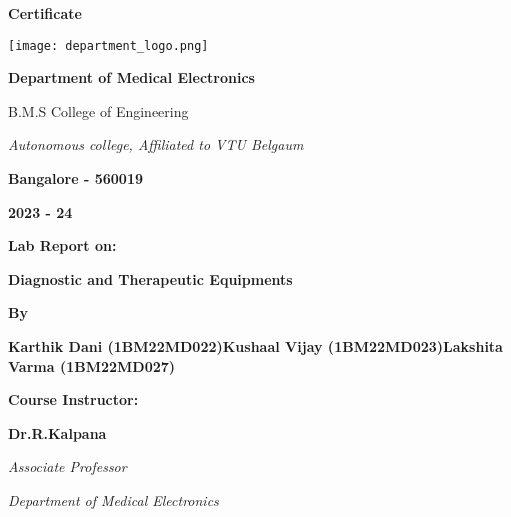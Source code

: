 \documentclass[a4paper, 12pt]{article}
\begin{document}
\begin{center}
    \LARGE \textbf{Certificate}
\end{center}

\vspace{0.5cm}

\begin{center}
    \texttt{[image: department\_logo.png]} %
\end{center}


\begin{center}
    \LARGE \textbf{Department of Medical Electronics}
\end{center}


\begin{center}
    \large B.M.S College of Engineering
\end{center}

\begin{center}
    \textit{Autonomous college, Affiliated to VTU Belgaum}
\end{center}

\begin{center}
    \textbf{Bangalore - 560019}
\end{center}

\begin{center}
    \textbf{2023 - 24}
\end{center}

\vspace{0.7cm}

\begin{center}
    \textbf{Lab Report on:}
\end{center}

\begin{center}
    \large \textbf{Diagnostic and Therapeutic Equipments}
\end{center}

\vspace{0.7cm}

\begin{center}
    \textbf{By}
\end{center}

\begin{center}
    \textbf{Karthik Dani (1BM22MD022)\n Kushaal Vijay (1BM22MD023)\n Lakshita Varma (1BM22MD027)}
\end{center}

\vspace{0.1cm}

\begin{center}
    \large \textbf{Course Instructor:}
\end{center}

\begin{center}
    \textbf{Dr.R.Kalpana}
\end{center}

\begin{center}
    \textit{Associate Professor}
\end{center}

\begin{center}
     \textit{Department of Medical Electronics}
\end{center}
\end{document}
